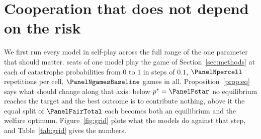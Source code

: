 
\section{Cooperation that does not depend on the risk}
\label{sec:riskgrid}

We first run every model in self-play across the full range of the one parameter that
should matter. \PanelNplayersWordCap{} seats of one model play the game of
Section~\ref{sec:methods} at each of \PanelNrisksWord{} catastrophe probabilities
from $0$ to $1$ in steps of $0.1$,
$\PanelNpercell$ repetitions per cell, $\PanelNgamesBaseline$ games in all.
Proposition~\ref{prop:eq} says what should change along that axis: below
$p^{*}=\PanelPstar$ no equilibrium reaches the target and the best outcome is to contribute
nothing, above it the equal split of $\PanelFairTotal$ each becomes both an equilibrium and
the welfare optimum. Figure~\ref{fig:grid} plots what the models do against that step, and
Table~\ref{tab:grid} gives the numbers.



